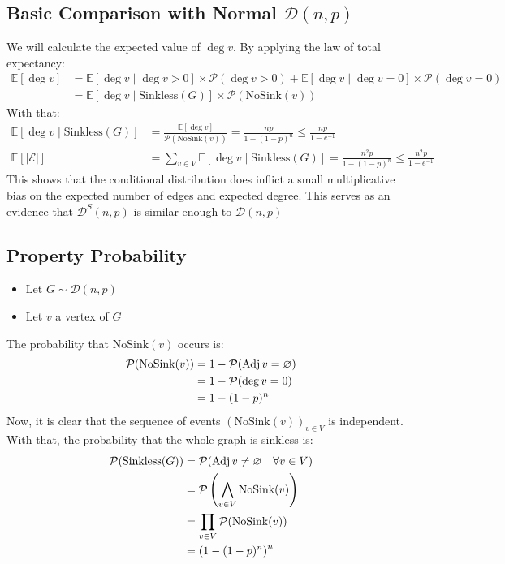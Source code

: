 \subsection{Basic Comparison with Normal $\mathcal{D}(n,p)$}
We will calculate the expected value of $\deg v.$ By applying the law of total expectancy:
\begin{align*}
	\mathbb{E}[\deg v]&= \mathbb{E}[\deg v\mid \deg v > 0]\times \mathscr{P}(\deg v> 0) + \mathbb{E}[\deg v \mid \deg v = 0] \times \mathscr{P}(\deg v=0) \\
	&=  \mathbb{E}[\deg v\mid \text{Sinkless}(G)]\times \mathscr{P}(\text{NoSink}(v))
\end{align*}
With that:
\begin{align*}
	\mathbb{E}[\deg v \mid \text{Sinkless}(G)] &= \frac{\mathbb{E}[\deg v]}{\mathscr{P}(\text{NoSink}(v))}=\frac{np}{1-(1-p)^n} \le \frac{np}{1-e^{-1}} \\
	\mathbb{E}[\lvert \mathcal{E} \rvert] &=\sum_{v\in V} 	\mathbb{E}[\deg v \mid \text{Sinkless}(G)]= \frac{n^2p}{1-(1-p)^n} \le \frac{n^2p}{1-e^{-1}}
\end{align*}
This shows that the conditional distribution does inflict a small multiplicative bias on the expected number of edges and expected degree.
\newline This serves as an evidence that $\mathcal{D}^S(n,p)$ is similar enough to $\mathcal{D}(n,p)$

\subsection{Property Probability}
\label{section:RandomGraphs:PropertyProbability}
\begin{itemize}
\item Let $G\sim \mathcal{D}(n,p)$
\item Let $v$ a vertex of $G$
\end{itemize}
The probability that $\text{NoSink}(v)$ occurs is:
\begin{align*}
\mathcal{P}(\text{NoSink}(v))&=1- \mathcal{P}(\operatorname{Adj} v=\varnothing) \\ 
&=1-\mathcal{P}(\deg v=0)  \\
&= 1-(1-p)^n  
\end{align*}
Now, it is clear that the sequence of events $(\text{NoSink}(v))_{v\in V}$ is independent.
\newline With that, the probability that the whole graph is sinkless is:
\begin{align}
	\mathcal{P}(\text{Sinkless}(G))&=\mathcal{P}(\operatorname{Adj} v\ne \varnothing\quad\forall v \in V) \nonumber\\
	&=\mathcal{P}\left(\bigwedge_{v\in V} \text{NoSink}(v)\right) \nonumber\\
	&=\prod_{v\in V}\mathcal{P}(\text{NoSink}(v)) \nonumber \\
	&=\left(1-(1-p)^n\right)^n \label{eqn:SinklessProbability}
\end{align}
